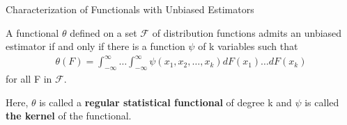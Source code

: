 \documentclass{beamer}
\begin{document}
\begin{frame}{Characterization of Functionals with Unbiased Estimators}

  \begin{theorem}
    A functional $\theta$ defined on a set $\mathcal{F}$ of distribution functions admits an unbiased estimator if and only if there is a function $\psi$ of k variables such that 
    \begin{align}\label{unbiased est}
        \theta(F) = \int_{-\infty}^{\infty} \dotsc \int_{-\infty}^{\infty} \psi(x_1, x_2, \dotsc, x_k)dF(x_1) \dotsc dF(x_k)
    \end{align}
    for all F in $\mathcal{F}$.
    \end{theorem}
    Here, $\theta$ is called a \textbf{regular statistical functional} of degree k and $\psi$ is called \textbf{the kernel} of the functional. 
 
\end{frame}
\end{document}
